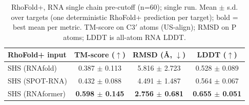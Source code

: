 \begin{table}[htbp]
\centering
\caption{RhoFold+, RNA single chain pre-cutoff (n=60); single run. Mean $\pm$ s.d. over targets (one deterministic RhoFold+ prediction per target); bold = best mean per metric. TM-score on C3$'$ atoms (US-align); RMSD on P atoms; LDDT is all-atom RNA LDDT.}
\label{tab:rf_rna_single_chain_pre_cutoff}
\begin{tabular}{lccc}
\toprule
RhoFold+ input & TM-score ($\uparrow$) & RMSD (\AA, $\downarrow$) & LDDT ($\uparrow$) \\
\midrule
SHS (RNAfold) & 0.387 $\pm$ 0.113 & 5.816 $\pm$ 2.723 & 0.528 $\pm$ 0.089 \\
SHS (SPOT-RNA) & 0.432 $\pm$ 0.088 & 4.491 $\pm$ 1.487 & 0.564 $\pm$ 0.067 \\
SHS (RNAformer) & \textbf{0.598 $\pm$ 0.145} & \textbf{2.756 $\pm$ 0.681} & \textbf{0.655 $\pm$ 0.051} \\
\bottomrule
\end{tabular}
\end{table}
